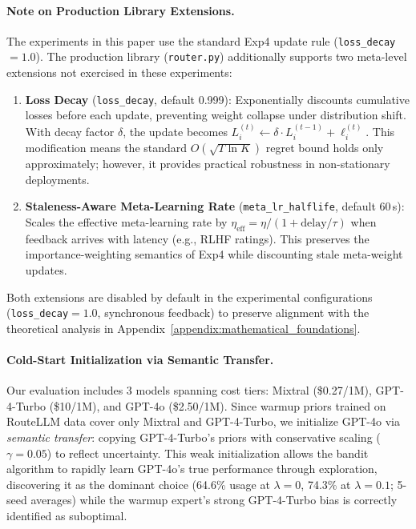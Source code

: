 \paragraph{Note on Production Library Extensions.}
The experiments in this paper use the standard Exp4 update rule (\texttt{loss\_decay}$=1.0$).
The production library (\texttt{router.py}) additionally supports two meta-level
extensions not exercised in these experiments:
\begin{enumerate}[leftmargin=*,noitemsep]
    \item \textbf{Loss Decay} (\texttt{loss\_decay}, default 0.999): Exponentially discounts
    cumulative losses before each update, preventing weight collapse under distribution
    shift. With decay factor $\delta$, the update becomes
    $L_i^{(t)} \leftarrow \delta \cdot L_i^{(t-1)} + \ell_i^{(t)}$.
    This modification means the standard $O(\sqrt{T \ln K})$ regret bound holds only approximately;
    however, it provides practical robustness in non-stationary deployments.
    \item \textbf{Staleness-Aware Meta-Learning Rate} (\texttt{meta\_lr\_halflife}, default 60\,s):
    Scales the effective meta-learning rate by $\eta_{\text{eff}} = \eta / (1 + \text{delay}/\tau)$
    when feedback arrives with latency (e.g., RLHF ratings). This preserves the importance-weighting
    semantics of Exp4 while discounting stale meta-weight updates.
\end{enumerate}
Both extensions are disabled by default in the experimental configurations
(\texttt{loss\_decay}$=1.0$, synchronous feedback) to preserve alignment with
the theoretical analysis in Appendix~\ref{appendix:mathematical_foundations}.

\paragraph{Cold-Start Initialization via Semantic Transfer.}
Our evaluation includes 3 models spanning cost tiers: Mixtral (\$0.27/1M), GPT-4-Turbo (\$10/1M), and GPT-4o (\$2.50/1M).
Since warmup priors trained on RouteLLM data cover only Mixtral and GPT-4-Turbo, we initialize GPT-4o via \emph{semantic transfer}: copying GPT-4-Turbo's priors with conservative scaling ($\gamma=0.05$) to reflect uncertainty.
This weak initialization allows the bandit algorithm to rapidly learn GPT-4o's true performance through exploration, discovering it as the dominant choice (64.6\% usage at $\lambda=0$, 74.3\% at $\lambda=0.1$; 5-seed averages) while the warmup expert's strong GPT-4-Turbo bias is correctly identified as suboptimal.
